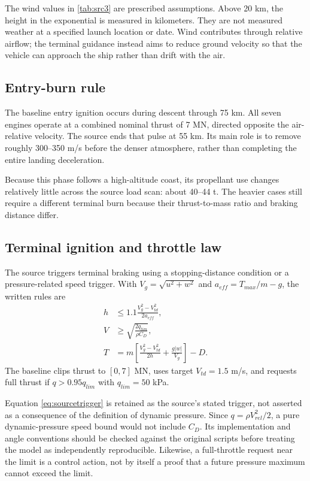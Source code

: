 \documentclass[11pt,a4paper]{article}
\begin{document}


The wind values in \cref{tab:src3} are prescribed assumptions. Above 20 km, the height in the exponential is measured in kilometers. They are not measured weather at a specified launch location or date. Wind contributes through relative airflow; the terminal guidance instead aims to reduce ground velocity so that the vehicle can approach the ship rather than drift with the air.

\subsection{Entry-burn rule}
The baseline entry ignition occurs during descent through 75 km. All seven engines operate at a combined nominal thrust of 7 MN, directed opposite the air-relative velocity. The source ends that pulse at 55 km. Its main role is to remove roughly 300--350 m/s before the denser atmosphere, rather than completing the entire landing deceleration.

Because this phase follows a high-altitude coast, its propellant use changes relatively little across the source load scan: about 40--44 t. The heavier cases still require a different terminal burn because their thrust-to-mass ratio and braking distance differ.

\subsection{Terminal ignition and throttle law}
The source triggers terminal braking using a stopping-distance condition or a pressure-related speed trigger. With $V_g=\sqrt{u^2+w^2}$ and $a_{eff}=T_{max}/m-g$, the written rules are
\begin{align}
 h&\le1.1\frac{V_g^2-V_{td}^2}{2a_{eff}},\label{eq:stoprule}\\
 V&\ge\sqrt{\frac{2q_{lim}}{\rho C_D}},\label{eq:sourcetrigger}\\
 T&=m\left[\frac{V_g^2-V_{td}^2}{2h}+\frac{g|w|}{V_g}\right]-D.
\label{eq:thrustlaw}
\end{align}
The baseline clips thrust to $[0,7]$ MN, uses target $V_{td}=1.5$ m/s, and requests full thrust if $q>0.95q_{lim}$ with $q_{lim}=50$ kPa.

Equation \eqref{eq:sourcetrigger} is retained as the source's stated trigger, not asserted as a consequence of the definition of dynamic pressure. Since $q=\rho V_{rel}^2/2$, a pure dynamic-pressure speed bound would not include $C_D$. Its implementation and angle conventions should be checked against the original scripts before treating the model as independently reproducible. Likewise, a full-throttle request near the limit is a control action, not by itself a proof that a future pressure maximum cannot exceed the limit.
\end{document}
